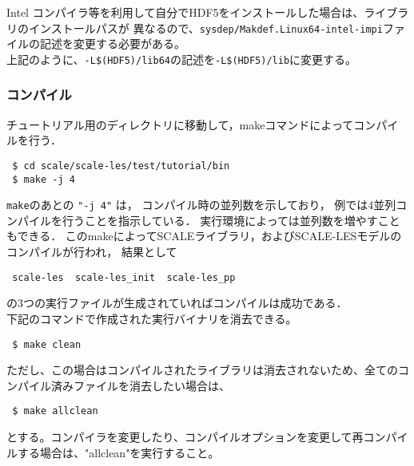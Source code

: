 Intel コンパイラ等を利用して自分でHDF5をインストールした場合は、ライブラリのインストールパスが
異なるので、\verb"sysdep/Makdef.Linux64-intel-impi"ファイルの記述を変更する必要がある。
\\
上記のように、\verb"-L$(HDF5)/lib64"の記述を\verb"-L$(HDF5)/lib"に変更する。


\subsubsection{コンパイル}

チュートリアル用のディレクトリに移動して，makeコマンドによってコンパイルを行う．
\begin{verbatim}
 $ cd scale/scale-les/test/tutorial/bin
 $ make -j 4
\end{verbatim}
\verb|make|のあとの \verb|"-j 4"| は，
コンパイル時の並列数を示しており，
例では4並列コンパイルを行うことを指示している．
実行環境によっては並列数を増やすこともできる．
このmakeによってSCALEライブラリ，およびSCALE-LESモデルのコンパイルが行われ，
結果として
\begin{verbatim}
 scale-les  scale-les_init  scale-les_pp
\end{verbatim}
の3つの実行ファイルが生成されていればコンパイルは成功である．\\

下記のコマンドで作成された実行バイナリを消去できる。
\begin{verbatim}
 $ make clean
\end{verbatim}
ただし、この場合はコンパイルされたライブラリは消去されないため、全てのコンパイル済みファイルを消去したい場合は、
\begin{verbatim}
 $ make allclean
\end{verbatim}
とする。コンパイラを変更したり、コンパイルオプションを変更して再コンパイルする場合は、"allclean"を実行すること。


